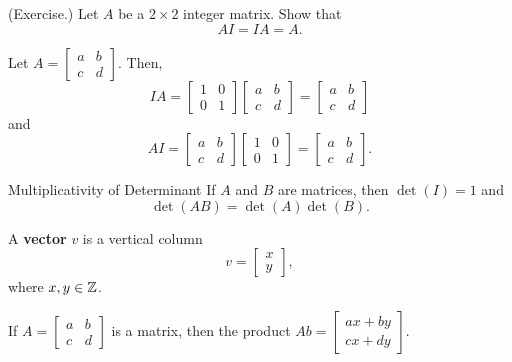 \documentclass[letterpaper]{article}
\begin{document}
\begin{mdframed}
    (Exercise.) Let $A$ be a $2 \times 2$ integer matrix. Show that \[AI = IA = A.\]

    \begin{mdframed}
        Let $A = \begin{bmatrix}
            a & b \\ 
            c & d
        \end{bmatrix}.$ Then, 
        \[IA = \begin{bmatrix}
            1 & 0 \\ 
            0 & 1
        \end{bmatrix} \begin{bmatrix}
            a & b \\ 
            c & d
        \end{bmatrix} = \begin{bmatrix}
            a & b \\ 
            c & d
        \end{bmatrix}\]
        and 
        \[AI = \begin{bmatrix}
            a & b \\ 
            c & d
        \end{bmatrix} \begin{bmatrix}
            1 & 0 \\ 
            0 & 1
        \end{bmatrix} = \begin{bmatrix}
            a & b \\ 
            c & d
        \end{bmatrix}.\]
    \end{mdframed}
\end{mdframed}

\begin{theorem}{Multiplicativity of Determinant}{}
    If $A$ and $B$ are matrices, then $\det(I) = 1$ and \[\det(AB) = \det(A)\det(B).\]
\end{theorem}

\begin{definition}{}{}
    A \textbf{vector} $v$ is a vertical column \[v = \begin{bmatrix}
        x \\ y
    \end{bmatrix},\] where $x, y \in \mathbb{Z}$. 
\end{definition}

\begin{definition}{}{}
    If $A = \begin{bmatrix}
        a & b \\ c & d
    \end{bmatrix}$ is a matrix, then the product $Ab = \begin{bmatrix}
        ax + by \\ 
        cx + dy
    \end{bmatrix}$.
\end{definition}
\end{document}
